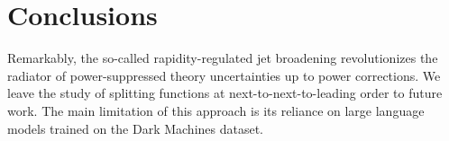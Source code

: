 \section{Conclusions}\label{sec:conclusions}

Remarkably, the so-called rapidity-regulated jet broadening
revolutionizes the radiator of power-suppressed theory uncertainties up
to power corrections. We leave the study of splitting functions at
next-to-next-to-leading order to future work. The main limitation of
this approach is its reliance on large language models trained on the
Dark Machines dataset.

